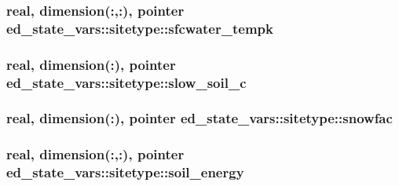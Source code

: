\subsubsection[{\texorpdfstring{sfcwater\+\_\+tempk}{sfcwater_tempk}}]{\setlength{\rightskip}{0pt plus 5cm}real, dimension(\+:,\+:), pointer ed\+\_\+state\+\_\+vars\+::sitetype\+::sfcwater\+\_\+tempk}\hypertarget{structed__state__vars_1_1sitetype_a20afeefd511f7e96170b06fb7853e95e}{}\label{structed__state__vars_1_1sitetype_a20afeefd511f7e96170b06fb7853e95e}
\subsubsection[{\texorpdfstring{slow\+\_\+soil\+\_\+c}{slow_soil_c}}]{\setlength{\rightskip}{0pt plus 5cm}real, dimension(\+:), pointer ed\+\_\+state\+\_\+vars\+::sitetype\+::slow\+\_\+soil\+\_\+c}\hypertarget{structed__state__vars_1_1sitetype_ab188c091858cc0306eef90d3ca0d10ce}{}\label{structed__state__vars_1_1sitetype_ab188c091858cc0306eef90d3ca0d10ce}
\subsubsection[{\texorpdfstring{snowfac}{snowfac}}]{\setlength{\rightskip}{0pt plus 5cm}real, dimension(\+:), pointer ed\+\_\+state\+\_\+vars\+::sitetype\+::snowfac}\hypertarget{structed__state__vars_1_1sitetype_aa1e990b84dfe908c98b9ef9efa0adfc7}{}\label{structed__state__vars_1_1sitetype_aa1e990b84dfe908c98b9ef9efa0adfc7}
\subsubsection[{\texorpdfstring{soil\+\_\+energy}{soil_energy}}]{\setlength{\rightskip}{0pt plus 5cm}real, dimension(\+:,\+:), pointer ed\+\_\+state\+\_\+vars\+::sitetype\+::soil\+\_\+energy}\hypertarget{structed__state__vars_1_1sitetype_a025a5d4036b2fff9e3a80a7e214c48ab}{}\label{structed__state__vars_1_1sitetype_a025a5d4036b2fff9e3a80a7e214c48ab}
